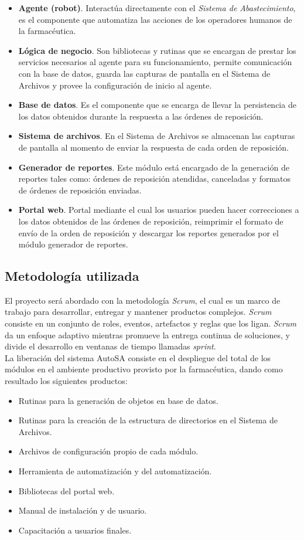 \begin{itemize}
\item \textbf{Agente (robot)}. Interactúa directamente con el \textit{Sistema de Abastecimiento}, es el componente que automatiza las acciones de los operadores humanos de la farmacéutica.
\item \textbf{Lógica de negocio}. Son bibliotecas y rutinas que se encargan de prestar los servicios necesarios al agente para su funcionamiento, permite comunicación con la base de datos, guarda las capturas de pantalla en el Sistema de Archivos y provee la configuración de inicio al agente.
\item \textbf{Base de datos}. Es el componente que se encarga de llevar la persistencia de los datos obtenidos durante la respuesta a las órdenes de reposición.
\item \textbf{Sistema de archivos}. En el Sistema de Archivos se almacenan las capturas de pantalla al momento de enviar la respuesta de cada orden de reposición.
\item \textbf{Generador de reportes}. Este módulo está encargado de la generación de reportes tales como: órdenes de reposición atendidas, canceladas y formatos de órdenes de reposición enviadas.
\item \textbf{Portal web}. Portal mediante el cual los usuarios pueden hacer correcciones a los datos obtenidos de las órdenes de reposición, reimprimir el formato de envío de la orden de reposición  y descargar los reportes generados por el módulo generador de reportes.
\end{itemize}

\subsection{Metodología utilizada}
El proyecto será abordado con la metodología \textit{Scrum}, el cual es un marco de trabajo para desarrollar, entregar y mantener productos complejos. \textit{Scrum} consiste en un conjunto de roles, eventos, artefactos y reglas que los ligan. \textit{Scrum} da un enfoque adaptivo mientras promueve la entrega continua de soluciones, y divide el desarrollo en ventanas de tiempo llamadas \textit{sprint}\cite{scrum}.\\
La liberación del sistema AutoSA consiste en el despliegue del total de los módulos en el ambiente productivo provisto por la farmacéutica, dando como resultado los siguientes productos:
\begin{itemize}
\item Rutinas para la generación de objetos en base de datos.
\item Rutinas para la creación de la estructura de directorios en el Sistema de Archivos.
\item Archivos de configuración propio de cada módulo.
\item Herramienta de automatización y del automatización.
\item Bibliotecas del portal web.
\item Manual de instalación y de usuario.
\item Capacitación a usuarios finales.
\end{itemize}
 
